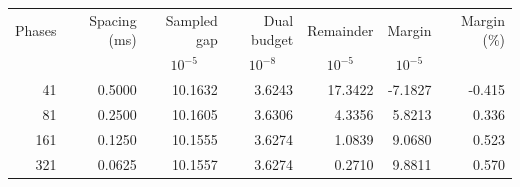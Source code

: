 \begin{tabular}{rrrrrrr}
\toprule
Phases & Spacing (ms) & Sampled gap & Dual budget & Remainder & Margin & Margin (\%)\\
 & & \multicolumn{1}{c}{$10^{-5}$} & \multicolumn{1}{c}{$10^{-8}$} & \multicolumn{1}{c}{$10^{-5}$} & \multicolumn{1}{c}{$10^{-5}$} & \\
\midrule
41 & 0.5000 & 10.1632 & 3.6243 & 17.3422 & -7.1827 & -0.415\\
81 & 0.2500 & 10.1605 & 3.6306 & 4.3356 & 5.8213 & 0.336\\
161 & 0.1250 & 10.1555 & 3.6274 & 1.0839 & 9.0680 & 0.523\\
321 & 0.0625 & 10.1557 & 3.6274 & 0.2710 & 9.8811 & 0.570\\
\bottomrule
\end{tabular}